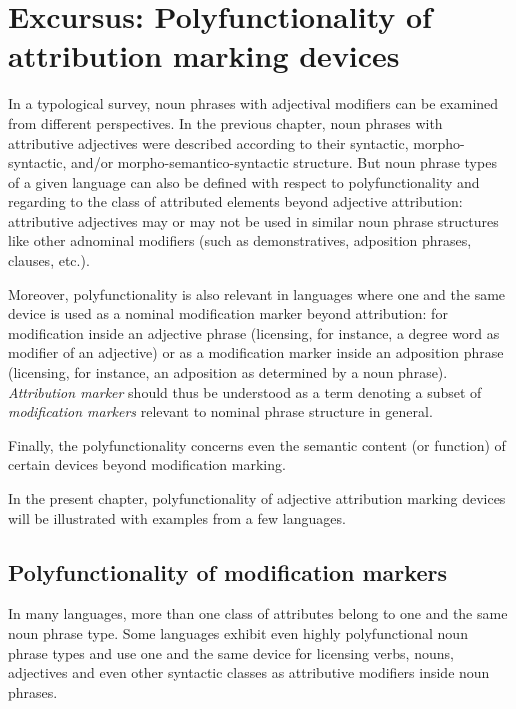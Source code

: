 
\chapter[Polyfunctionality]{Excursus: Polyfunctionality of attribution marking devices} \label{polyfunctionality}
In a typological survey, noun phrases with adjectival modifiers can be examined from different perspectives. In the previous chapter, noun phrases with attributive adjectives were described according to their syntactic, morpho-syntactic, and/or morpho-semantico-syntactic structure. But noun phrase types of a given language can also be defined with respect to polyfunctionality and regarding to the class of attributed elements beyond adjective attribution: attributive adjectives may or may not be used in similar noun phrase structures like other adnominal modifiers (such as demonstratives, adposition phrases, clauses, etc.).

Moreover, polyfunctionality is also relevant in languages where one and the same device is used as a nominal modification marker beyond attribution: for modification inside an adjective phrase (licensing, for instance, a degree word as modifier of an adjective) or as a modification marker inside an adposition phrase (licensing, for instance, an adposition as determined by a noun phrase). \textit{Attribution marker} should thus be understood as a term denoting a subset of \textit{modification markers} relevant to nominal phrase structure in general.

Finally, the polyfunctionality concerns even the semantic content (or function) of certain devices beyond modification marking. 

In the present chapter, polyfunctionality of adjective attribution marking devices will be illustrated with examples from a few languages.

\section{Polyfunctionality of modification markers}
In many languages, more than one class of attributes belong to one and the same noun phrase type. Some languages exhibit even highly polyfunctional noun phrase types and use one and the same device for licensing verbs, nouns, adjectives and even other syntactic classes as attributive modifiers inside noun phrases.


